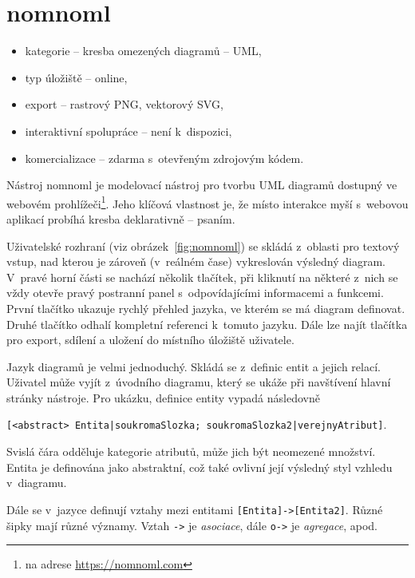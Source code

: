 \section{nomnoml}

\begin{itemize}
  \item kategorie -- kresba omezených diagramů -- UML,
  \item typ úložiště -- online,
  \item export -- rastrový PNG, vektorový SVG,
  \item interaktivní spolupráce -- není k~dispozici,
  \item komercializace -- zdarma s~otevřeným zdrojovým kódem.
\end{itemize}

Nástroj nomnoml je modelovací nástroj pro tvorbu UML diagramů dostupný ve webovém prohlížeči\footnote{na adrese \url{https://nomnoml.com}}.
Jeho klíčová vlastnost je, že místo interakce myší s~webovou aplikací probíhá kresba deklarativně -- psaním.

Uživatelské rozhraní (viz obrázek~\ref{fig:nomnoml}) se skládá z~oblasti pro textový vstup, nad kterou je zároveň (v~reálném čase) vykreslován výsledný diagram.
V~pravé horní části se nachází několik tlačítek, při kliknutí na některé z~nich se vždy otevře pravý postranní panel s~odpovídajícími informacemi a funkcemi.
První tlačítko ukazuje rychlý přehled jazyka, ve kterém se má diagram definovat.
Druhé tlačítko odhalí kompletní referenci k~tomuto jazyku.
Dále lze najít tlačítka pro export, sdílení a uložení do místního úložiště uživatele.

Jazyk diagramů je velmi jednoduchý.
Skládá se z~definic entit a jejich relací.
Uživatel může vyjít z~úvodního diagramu, který se ukáže při navštívení hlavní stránky nástroje.
Pro ukázku, definice entity vypadá následovně

\noindent\texttt{[<abstract> Entita|soukromaSlozka; soukromaSlozka2|verejnyAtribut]}.

Svislá čára odděluje kategorie atributů, může jich být neomezené množství.
Entita je definována jako abstraktní, což také ovlivní její výsledný styl vzhledu v~diagramu.

Dále se v~jazyce definují vztahy mezi entitami \texttt{[Entita]->[Entita2]}.
Různé šipky mají různé významy.
Vztah \texttt{->} je \emph{asociace}, dále \texttt{o->} je \emph{agregace}, apod.


